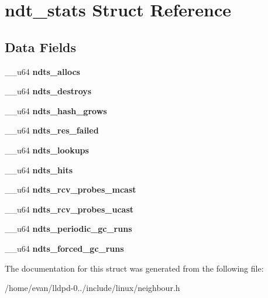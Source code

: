 \section{ndt\-\_\-stats \-Struct \-Reference}
\label{structndt__stats}
\subsection*{\-Data \-Fields}
\begin{DoxyCompactItemize}
\item 
\-\_\-\-\_\-u64 {\bfseries ndts\-\_\-allocs}\label{structndt__stats_ad923cfaa5f884641318a415382a3b791}

\item 
\-\_\-\-\_\-u64 {\bfseries ndts\-\_\-destroys}\label{structndt__stats_a91c70b5e2f52374400a61dc19683f69f}

\item 
\-\_\-\-\_\-u64 {\bfseries ndts\-\_\-hash\-\_\-grows}\label{structndt__stats_a469e7f30fa5e039e59a7b37a044e7da8}

\item 
\-\_\-\-\_\-u64 {\bfseries ndts\-\_\-res\-\_\-failed}\label{structndt__stats_acf89c81aecb19cb18c44509dece24966}

\item 
\-\_\-\-\_\-u64 {\bfseries ndts\-\_\-lookups}\label{structndt__stats_ab274930c7fa4692326b1afd9e379857e}

\item 
\-\_\-\-\_\-u64 {\bfseries ndts\-\_\-hits}\label{structndt__stats_a0e6dbe1548ccf007fe238b2b71f60386}

\item 
\-\_\-\-\_\-u64 {\bfseries ndts\-\_\-rcv\-\_\-probes\-\_\-mcast}\label{structndt__stats_ab8e32f51c4451601043d9bdecab3cda5}

\item 
\-\_\-\-\_\-u64 {\bfseries ndts\-\_\-rcv\-\_\-probes\-\_\-ucast}\label{structndt__stats_ae4289c3b42d6bb3f41707a68d25b00a5}

\item 
\-\_\-\-\_\-u64 {\bfseries ndts\-\_\-periodic\-\_\-gc\-\_\-runs}\label{structndt__stats_a601a37bc01d2ef4f92c8aa3ee6309531}

\item 
\-\_\-\-\_\-u64 {\bfseries ndts\-\_\-forced\-\_\-gc\-\_\-runs}\label{structndt__stats_a0af79fb5531417fef14236d25f61b21c}

\end{DoxyCompactItemize}


\-The documentation for this struct was generated from the following file\-:\begin{DoxyCompactItemize}
\item 
/home/evan/lldpd-\/0../include/linux/neighbour.\-h\end{DoxyCompactItemize}
